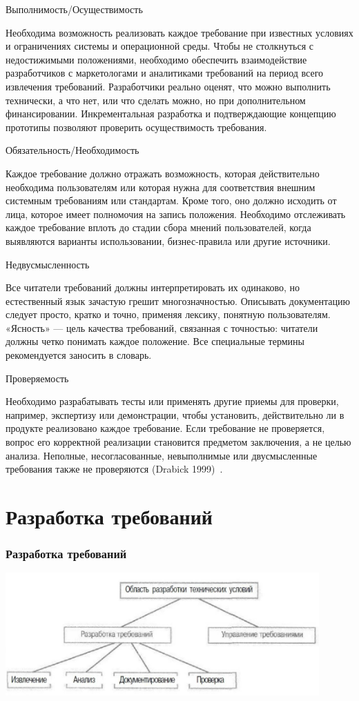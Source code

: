 \documentclass{../industrial-development}
\begin{document}
\alert{Выполнимость/Осуществимость}

Необходима возможность реализовать каждое требование при известных условиях и ограничениях системы и операционной среды.
Чтобы не столкнуться с недостижимыми положениями, необходимо обеспечить взаимодействие разработчиков с маркетологами и аналитиками требований
на период всего извлечения требований. Разработчики реально оценят, что можно выполнить технически, а что нет, или что сделать можно, но при дополнительном финансировании. Инкрементальная разработка и подтверждающие концепцию прототипы позволяют проверить осуществимость требования.

\alert{Обязательность/Необходимость}

Каждое требование должно отражать возможность, которая действительно необходима пользователям или которая нужна для соответствия внешним системным требованиям или стандартам. Кроме того,
оно должно исходить от лица, которое имеет полномочия на запись положения. Необходимо отслеживать каждое требование вплоть до стадии сбора
мнений пользователей, когда выявляются варианты использовании, бизнес-правила или другие источники.

\alert{Недвусмысленность}

Все читатели требований должны интерпретировать их одинаково, но естественный язык зачастую грешит многозначностью. Описывать документацию следует просто, кратко и точно, применяя лексику, понятную пользователям. «Ясность» — цель качества требований, связанная с точностью: читатели должны четко понимать каждое положение. Все специальные термины рекомендуется заносить в словарь.

\alert{Проверяемость}

Необходимо разрабатывать тесты или применять другие приемы для проверки, например, экспертизу или демонстрации, чтобы
установить, действительно ли в продукте реализовано каждое требование. Если требование не проверяется, вопрос его корректной реализации становится предметом заключения, а не целью анализа. Неполные, несогласованные, невыполнимые или двусмысленные требования также не проверяются (Drabick 1999)~\cite[с.~24]{Wiegers}.

\section{Разработка требований}
\begin{frame} \frametitle{Разработка требований}
  \centerline{\includegraphics[width=0.9\textwidth]{pict3.pdf}}
\end{frame}
\end{document}
